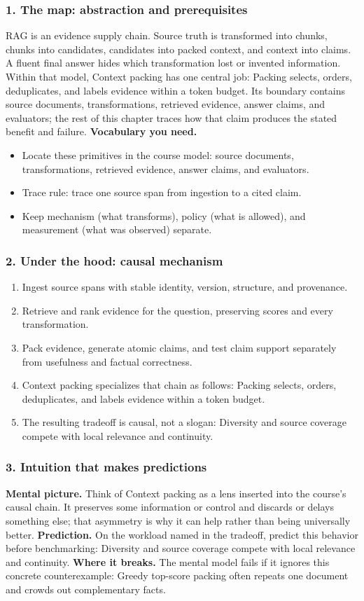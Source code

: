\subsubsection*{1. The map: abstraction and prerequisites}
RAG is an evidence supply chain. Source truth is transformed into chunks, chunks into candidates, candidates into packed context, and context into claims. A fluent final answer hides which transformation lost or invented information.
Within that model, Context packing has one central job: Packing selects, orders, deduplicates, and labels evidence within a token budget. Its boundary contains source documents, transformations, retrieved evidence, answer claims, and evaluators; the rest of this chapter traces how that claim produces the stated benefit and failure.
\textbf{Vocabulary you need.}\begin{itemize}
\item Locate these primitives in the course model: source documents, transformations, retrieved evidence, answer claims, and evaluators.
\item Trace rule: trace one source span from ingestion to a cited claim.
\item Keep mechanism (what transforms), policy (what is allowed), and measurement (what was observed) separate.
\end{itemize}
\subsubsection*{2. Under the hood: causal mechanism}\begin{enumerate}
\item Ingest source spans with stable identity, version, structure, and provenance.
\item Retrieve and rank evidence for the question, preserving scores and every transformation.
\item Pack evidence, generate atomic claims, and test claim support separately from usefulness and factual correctness.
\item Context packing specializes that chain as follows: Packing selects, orders, deduplicates, and labels evidence within a token budget.
\item The resulting tradeoff is causal, not a slogan: Diversity and source coverage compete with local relevance and continuity.
\end{enumerate}
\subsubsection*{3. Intuition that makes predictions}
\textbf{Mental picture.} Think of Context packing as a lens inserted into the course's causal chain. It preserves some information or control and discards or delays something else; that asymmetry is why it can help rather than being universally better.
\textbf{Prediction.} On the workload named in the tradeoff, predict this behavior before benchmarking: Diversity and source coverage compete with local relevance and continuity.
\textbf{Where it breaks.} The mental model fails if it ignores this concrete counterexample: Greedy top-score packing often repeats one document and crowds out complementary facts.
